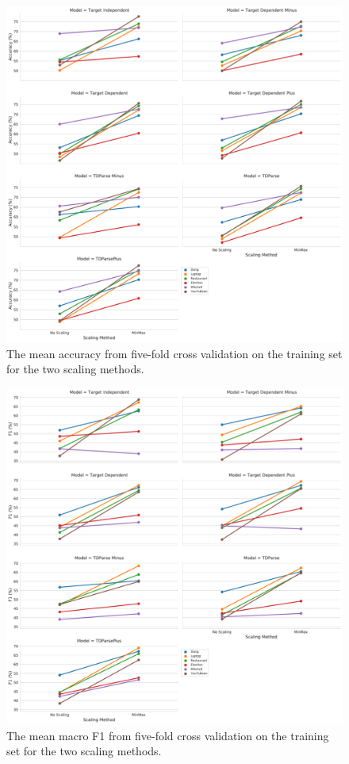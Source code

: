 \begin{figure}[!h]
    \centering
    \includegraphics[scale=0.35]{images/reproducibility/Parameters/Scaling/Scaling_Accuracy_Plot.pdf}
    \caption{The mean accuracy from five-fold cross validation on the training set for the two scaling methods.}
    \label{fig:repro_parameters_scaling_accuracy_plot}
\end{figure}

\begin{figure}[!h]
    \centering
    \includegraphics[scale=0.35]{images/reproducibility/Parameters/Scaling/Scaling_F1_Plot.pdf}
    \caption{The mean macro F1 from five-fold cross validation on the training set for the two scaling methods.}
    \label{fig:repro_parameters_scaling_macro_f1_plot}
\end{figure}

